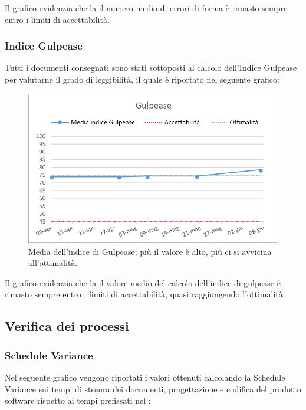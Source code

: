 Il grafico evidenzia che la il numero medio di errori di forma è rimasto sempre entro i limiti di accettabilità.

\subsubsection{Indice Gulpease}

Tutti i documenti consegnati sono stati sottoposti al calcolo dell'Indice Gulpease per valutarne il grado di leggibilità, il quale è riportato nel seguente grafico:

\begin{figure}[h!]
	\centering
	\includegraphics[scale=0.75]{img/Grafici/Gulpease.png}
	\caption{Media dell'indice di Gulpease; più il valore è alto, più ci si avvicina all'ottimalità.}
	\label{fig:Gulpease}
\end{figure}

Il grafico evidenzia che la il valore medio del calcolo dell'indice di gulpease è rimasto sempre entro i limiti di accettabilità, quasi raggiungendo l'ottimalità.
\subsection{Verifica dei processi}
\subsubsection{Schedule Variance}
Nel seguente grafico vengono riportati i valori ottenuti calcolando la Schedule Variance sui tempi di stesura dei documenti, progettazione e codifica del prodotto software rispetto ai tempi prefissati nel \PdP{}:

